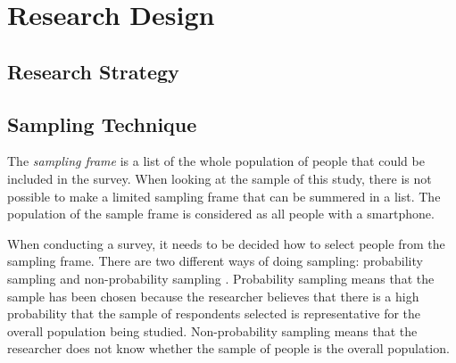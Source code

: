 
\section{Research Design}\label{sec:datacollection}

	\subsection{Research Strategy} \label{sec:researchstrategy}

	\subsection{Sampling Technique} \label{sec:sampling}
      
    The {\it sampling frame} is a list of the whole population of people that could be included in the survey. When looking at the sample of this study, there is not possible to make a limited sampling frame that can be summered in a list. The population of the sample frame is considered as all people with a smartphone.

    When conducting a survey, it needs to be decided how to select people from the sampling frame. There are two different ways of doing sampling: probability sampling and non-probability sampling \cite{empiriske}. Probability sampling means that the sample has been chosen because the researcher believes that there is a high probability that the sample of respondents selected is representative for the overall population being studied. Non-probability sampling means that the researcher does not know whether the sample of people is the overall population.

